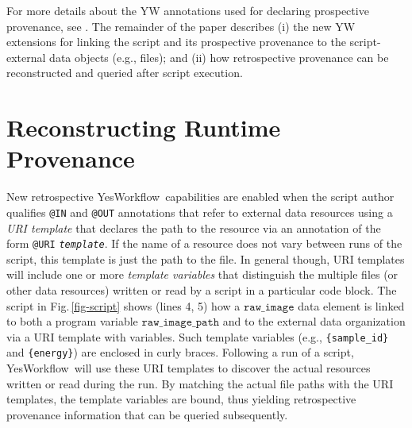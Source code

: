 \documentclass[nocopyrightspace]{sigplanconf}
\newcommand{\figref}[1]{Fig.\,\ref{#1}}
\newcommand{\code}[1]{\ensuremath{\mathtt{#1}}}
\newcommand{\YW}{\textsf{YesWorkflow}}
\newcommand{\ywa}[1]{\texttt{#1}}
\begin{document}
For more details about the YW annotations used for declaring
prospective provenance, see \cite{mcphillips2015ywIJDC}.  The
remainder of the paper describes (i) the new YW extensions for linking
the script and its prospective provenance to the script-external data
objects (e.g., files); and (ii) how retrospective provenance can be
reconstructed and queried after script execution.



\section{Reconstructing Runtime Provenance}
\label{sec:reconstr-retr-prov}

New retrospective \YW\ capabilities are enabled when the script author
qualifies \ywa{@IN} and \ywa{@OUT} annotations that refer to external
data resources using a \emph{URI template} that declares the path to the resource via
an annotation of the form
\ywa{@URI}\,\textvisiblespace\,\ywa{\emph{template}}.  If the name of
a resource does not vary between runs of the script, this template is
just the path to the file.  In general though, URI templates will
include one or more \emph{template variables} that distinguish the
multiple files (or other data resources) written or read by a script
in a particular code block.  The script in \figref{fig-script} shows
(lines 4, 5) how a \code{raw\_image} data element is linked to both a
program variable \code{raw\_image\_path} and to the external data
organization via a URI template with variables. Such template variables (e.g.,
\verb|{sample_id}| and \verb|{energy}|) are enclosed in curly braces.
Following a run of a script, \YW\ will use these URI templates to
discover the actual resources written or read during the run.  By
matching the actual file paths with the URI templates, the template
variables are bound, thus yielding retrospective provenance
information that can be queried subsequently.
\end{document}
